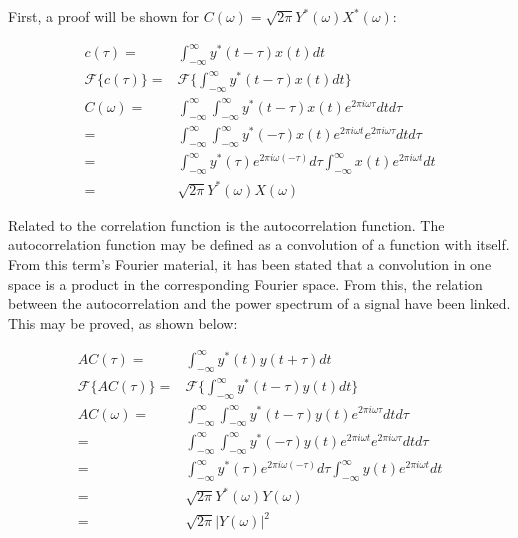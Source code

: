 \documentclass[twocolumn]{article}
\begin{document}
First, a proof will be shown for $C(\omega) = \sqrt{2\pi} Y^*(\omega)X^*(\omega)$:

\begin{equation}
\begin{split}
c(\tau) = & \int_{-\infty}^{\infty} y^*(t - \tau) x(t) dt\\
\mathcal{F} \{c(\tau)\} = & \mathcal{F} \{\int_{-\infty}^{\infty} y^*(t - \tau) x(t) dt\} \\
C(\omega) = & \int_{-\infty}^{\infty} \int_{-\infty}^{\infty} y^*(t - \tau) x(t) e^{2\pi i \omega \tau} dt d\tau \\
= & \int_{-\infty}^{\infty} \int_{-\infty}^{\infty} y^*(-\tau) x(t) e^{2\pi i \omega t} e^{2\pi i \omega \tau} dt d\tau \\
= & \int_{-\infty}^{\infty}y^*(\tau) e^{2\pi i \omega (-\tau)}  d\tau \int_{-\infty}^{\infty}  x(t)  e^{2\pi i \omega t} dt \\
= &\sqrt{2\pi} Y^*(\omega)X(\omega)
\end{split}
\end{equation}

Related to the correlation function is the autocorrelation function. The autocorrelation function may be defined as a convolution of a function with itself. From this term's Fourier material, it has been stated that a convolution in one space is a product in the corresponding Fourier space. From this, the relation between the autocorrelation and the power spectrum of a signal have been linked. This may be proved, as shown below:

\begin{equation}
\begin{split}
AC(\tau) = & \int_{-\infty}^{\infty} y^*(t) y(t + \tau) dt\\
\mathcal{F} \{AC(\tau)\} = & \mathcal{F} \{\int_{-\infty}^{\infty} y^*(t - \tau) y(t) dt\} \\
AC(\omega) = & \int_{-\infty}^{\infty} \int_{-\infty}^{\infty} y^*(t - \tau) y(t) e^{2\pi i \omega \tau} dt d\tau \\
= & \int_{-\infty}^{\infty} \int_{-\infty}^{\infty} y^*(-\tau) y(t) e^{2\pi i \omega t} e^{2\pi i \omega \tau} dt d\tau \\
= & \int_{-\infty}^{\infty}y^*(\tau) e^{2\pi i \omega (-\tau)}  d\tau \int_{-\infty}^{\infty}  y(t)  e^{2\pi i \omega t} dt \\
= &\sqrt{2\pi} Y^*(\omega)Y(\omega) \\
= & \sqrt{2\pi} |Y(\omega)|^2
\end{split}
\end{equation}
\end{document}
